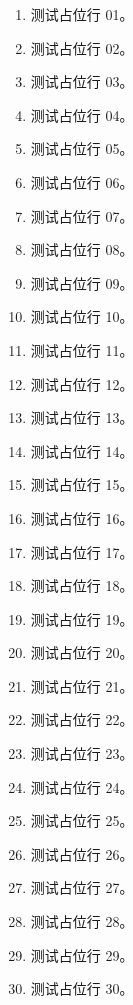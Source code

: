\begin{enumerate}
  \item 测试占位行 01。
  \item 测试占位行 02。
  \item 测试占位行 03。
  \item 测试占位行 04。
  \item 测试占位行 05。
  \item 测试占位行 06。
  \item 测试占位行 07。
  \item 测试占位行 08。
  \item 测试占位行 09。
  \item 测试占位行 10。
  \item 测试占位行 11。
  \item 测试占位行 12。
  \item 测试占位行 13。
  \item 测试占位行 14。
  \item 测试占位行 15。
  \item 测试占位行 16。
  \item 测试占位行 17。
  \item 测试占位行 18。
  \item 测试占位行 19。
  \item 测试占位行 20。
  \item 测试占位行 21。
  \item 测试占位行 22。
  \item 测试占位行 23。
  \item 测试占位行 24。
  \item 测试占位行 25。
  \item 测试占位行 26。
  \item 测试占位行 27。
  \item 测试占位行 28。
  \item 测试占位行 29。
  \item 测试占位行 30。
\end{enumerate}


